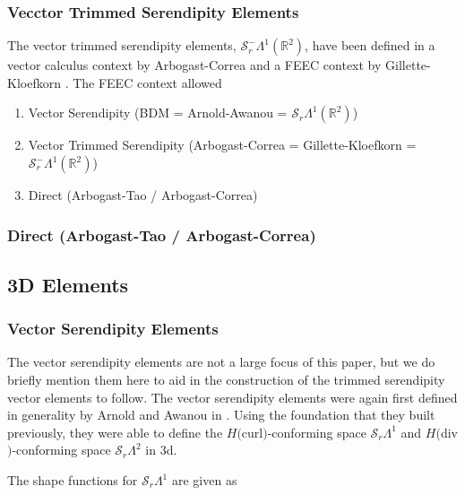 \documentclass[manuscript,screen]{acmart}
\newcommand{\R}{\mathbb{R}}
\newcommand{\calS}{\mathcal{S}}
\newcommand{\hcurl}{$H($curl$)$}
\newcommand{\hdiv}{$H($div$)$}
\begin{document}
  \subsubsection{Vecctor Trimmed Serendipity Elements}
  The vector trimmed serendipity elements, $\calS_r^-\Lambda^1(\R^2)$, have been defined in a vector calculus context by Arbogast-Correa \cite{arbogast2018direct} and a FEEC context by Gillette-Kloefkorn \cite{gillette2019trimmed}.  The FEEC context allowed 
  
  \begin{enumerate}
  \item Vector Serendipity (BDM = Arnold-Awanou = $\calS_r\Lambda^1(\R^2)$)
  \item Vector Trimmed Serendipity (Arbogast-Correa = Gillette-Kloefkorn = $\calS_r^-\Lambda^1(\R^2)$)
  \item Direct (Arbogast-Tao / Arbogast-Correa)
  
  
  
  
  \end{enumerate}
  
  \subsubsection{Direct (Arbogast-Tao / Arbogast-Correa)}
  
  \subsection{3D Elements}
  
  
  \subsubsection{Vector Serendipity Elements}
  
  The vector serendipity elements are not a large focus of this paper, but we do briefly mention them here to aid in the construction of the trimmed serendipity vector elements to follow.  The vector serendipity elements were again first defined in generality by Arnold and Awanou in \cite{arnold2014finite}.  Using the foundation that they built previously, they were able to define the \hcurl-conforming space $\calS_r \Lambda^1$ and \hdiv-conforming space $\calS_r \Lambda^2$ in 3d.  
  
  The shape functions for $\calS_r \Lambda^1$ are given as 
  
\end{document}
